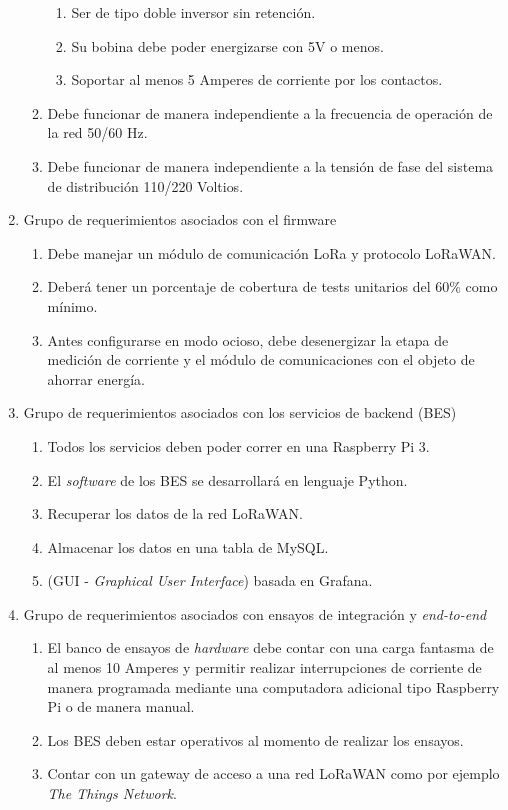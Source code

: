 \begin{enumerate}
\begin{enumerate}
\begin{enumerate}
			\item Ser de tipo doble inversor sin retención.
			\item Su bobina debe poder energizarse con 5V o menos.
			\item Soportar al menos 5 Amperes de corriente por los contactos.
		\end{enumerate} 
		\item Debe funcionar de manera independiente a la frecuencia de operación de la red 50/60 Hz.
		\item Debe funcionar de manera independiente a la tensión de fase del sistema de distribución 110/220 Voltios.
	\end{enumerate}
	\item Grupo de requerimientos asociados con el firmware
	\begin{enumerate}
		\item Debe manejar un módulo de comunicación LoRa y protocolo LoRaWAN.
		\item Deberá tener un porcentaje de cobertura de tests unitarios del 60\% como mínimo.
		\item Antes configurarse en modo ocioso, debe desenergizar la etapa de medición de corriente y el módulo de comunicaciones con el objeto de ahorrar energía.
	\end{enumerate}
	
	\item Grupo de requerimientos asociados con los servicios de backend (BES)
	\label{requerimientos_backend}
	\begin{enumerate}
		\item Todos los servicios deben poder correr en una Raspberry Pi 3.
		\item El \textit{software} de los BES se desarrollará en lenguaje Python.
		\item Recuperar los datos de la red LoRaWAN.\label{requerimiento_LORAWAN}
		\item Almacenar los datos en una tabla de MySQL.
		\item (GUI - \textit{Graphical User Interface}) basada en Grafana.
	\end{enumerate}
	
	\item Grupo de requerimientos asociados con ensayos de integración y \textit{end-to-end}
	\begin{enumerate}
		\item El banco de ensayos de \textit{hardware} debe contar con una carga fantasma de al menos 10 Amperes y permitir realizar interrupciones de corriente de manera programada mediante una computadora adicional tipo Raspberry Pi o de manera manual.
		\item Los BES deben estar operativos al momento de realizar los ensayos.
		\item Contar con un gateway de acceso a una red LoRaWAN como por ejemplo \textit{The Things Network}.
	\end{enumerate}
\end{enumerate}


